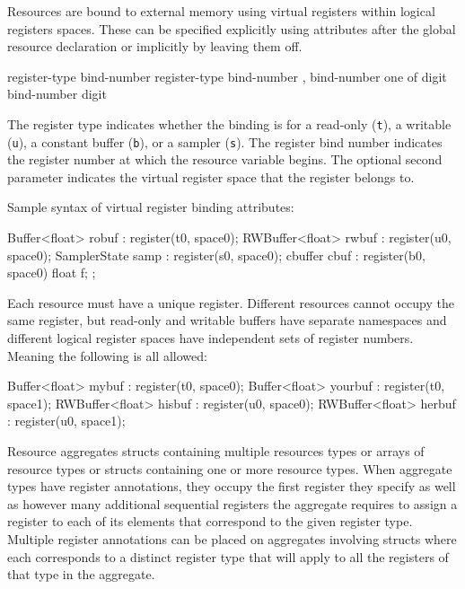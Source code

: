 Resources are bound to external memory using virtual registers within logical registers spaces.
These can be specified explicitly using attributes after the global resource declaration
or implicitly by leaving them off.

\begin{grammar}
  \br
   register-type bind-number \terminal{)}\br
   register-type bind-number ,  bind-number \terminal{)}\br
   \textnormal{one of}\br
  \br
  \br
  digit\br
  bind-number digit\br
\end{grammar}

The register type indicates whether the binding is for a read-only (\texttt{t}), a writable (\texttt{u}),
a constant buffer (\texttt{b}), or a sampler (\texttt{s}).
The register bind number indicates the register number at which the resource variable begins.
The optional second parameter indicates the virtual register space that the register belongs to.

Sample syntax of virtual register binding attributes:
\begin{HLSL}
  Buffer<float> robuf : register(t0, space0);
  RWBuffer<float> rwbuf : register(u0, space0);
  SamplerState samp : register(s0, space0);
  cbuffer cbuf : register(b0, space0) { float f; };
\end{HLSL}

Each resource must have a unique register. Different resources cannot occupy the same register,
but read-only and writable buffers have separate namespaces and different logical register spaces have independent
sets of register numbers. Meaning the following is all allowed:
\begin{HLSL}
  Buffer<float> mybuf : register(t0, space0);
  Buffer<float> yourbuf : register(t0, space1);
  RWBuffer<float> hisbuf : register(u0, space0);
  RWBuffer<float> herbuf : register(u0, space1);
\end{HLSL}

Resource aggregates structs containing multiple resources types or arrays of resource types or structs containing one or more resource types.
When aggregate types have register annotations, they occupy the first register they specify as well as however many additional sequential registers
the aggregate requires to assign a register to each of its elements that correspond to the given register type.
Multiple register annotations can be placed on aggregates involving structs where each corresponds to a distinct
register type that will apply to all the registers of that type in the aggregate.

